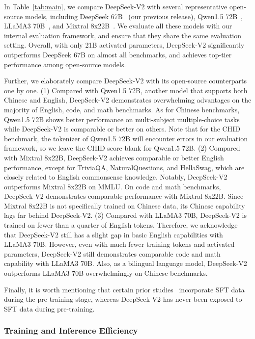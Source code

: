 \documentclass[11pt, a4paper, logo, copyright, nonumbering]{deepseek}
\newcommand{\dsvi}{DeepSeek 67B}
\newcommand{\dsvii}{DeepSeek-V2}
\begin{document}
\begin{CJK*}{UTF8}{gbsn}
In Table~\ref{tab:main}, we compare \dsvii{} with several representative open-source models, including DeepSeek 67B~\citep{deepseek1} (our previous release), Qwen1.5 72B~\citep{qwen}, LLaMA3 70B~\citep{llama3}, and Mixtral 8x22B~\citep{mixtral8x22b}. 
We evaluate all these models with our internal evaluation framework, and ensure that they share the same evaluation setting. 
Overall, with only 21B activated parameters, \dsvii{} significantly outperforms \dsvi{} on almost all benchmarks, and achieves top-tier performance among open-source models. 

Further, we elaborately compare \dsvii{} with its open-source counterparts one by one. 
(1)
Compared with Qwen1.5 72B, another model that supports both Chinese and English, \dsvii{} demonstrates overwhelming advantages on the majority of English, code, and math benchmarks. 
As for Chinese benchmarks, Qwen1.5 72B shows better performance on multi-subject multiple-choice tasks while \dsvii{} is comparable or better on others. 
Note that for the CHID benchmark, the tokenizer of Qwen1.5 72B will encounter errors in our evaluation framework, so we leave the CHID score blank for Qwen1.5 72B. 
(2)
Compared with Mixtral 8x22B, \dsvii{} achieves comparable or better English performance, except for TriviaQA, NaturalQuestions, and HellaSwag, which are closely related to English commonsense knowledge. 
Notably, \dsvii{} outperforms Mixtral 8x22B on MMLU. 
On code and math benchmarks, \dsvii{} demonstrates comparable performance with Mixtral 8x22B. 
Since Mixtral 8x22B is not specifically trained on Chinese data, its Chinese capability lags far behind \dsvii{}. 
(3)
Compared with LLaMA3 70B, \dsvii{} is trained on fewer than a quarter of English tokens. 
Therefore, we acknowledge that \dsvii{} still has a slight gap in basic English capabilities with LLaMA3 70B. 
However, even with much fewer training tokens and activated parameters, \dsvii{} still demonstrates comparable code and math capability with LLaMA3 70B. 
Also, as a bilingual language model, \dsvii{} outperforms LLaMA3 70B overwhelmingly on Chinese benchmarks. 

Finally, it is worth mentioning that certain prior studies~\citep{minicpm} incorporate SFT data during the pre-training stage, whereas \dsvii{} has never been exposed to SFT data during pre-training. 

\subsubsection{Training and Inference Efficiency}


\end{CJK*}
\end{document}
